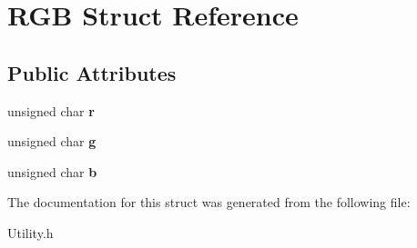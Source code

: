 \hypertarget{struct_r_g_b}{\section{R\-G\-B Struct Reference}
\label{struct_r_g_b}
}
\subsection*{Public Attributes}
\begin{DoxyCompactItemize}
\item 
\hypertarget{struct_r_g_b_a8ea970fcd312802ef238733b1c9ed63d}{unsigned char {\bfseries r}}\label{struct_r_g_b_a8ea970fcd312802ef238733b1c9ed63d}

\item 
\hypertarget{struct_r_g_b_a3595e9a2ed44c815153aff4e84e2d97c}{unsigned char {\bfseries g}}\label{struct_r_g_b_a3595e9a2ed44c815153aff4e84e2d97c}

\item 
\hypertarget{struct_r_g_b_ab2a3ac761d61594e2c51d65347a74017}{unsigned char {\bfseries b}}\label{struct_r_g_b_ab2a3ac761d61594e2c51d65347a74017}

\end{DoxyCompactItemize}


The documentation for this struct was generated from the following file\-:\begin{DoxyCompactItemize}
\item 
Utility.\-h\end{DoxyCompactItemize}
